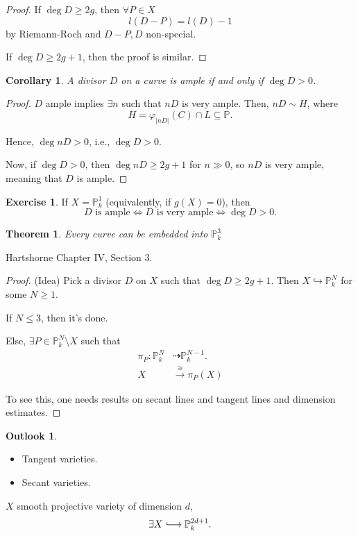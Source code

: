 \documentclass[12pt]{article}
\newtheorem*{theorem}{Theorem}
\newtheorem*{corollary}{Corollary}
\theoremstyle{definition}
\newtheorem*{exercise}{Exercise}
\newtheorem*{outlook}{Outlook}
\begin{document}
\begin{proof}
If $\deg D\geq2g$, then $\forall P\in X$
\[l(D-P)=l(D)-1\]
by Riemann-Roch and $D-P,D$ non-special.

If $\deg D\geq2g+1$, then the proof is similar.
\end{proof}

\begin{corollary}
A divisor $D$ on a curve is ample if and only if $\deg D>0$.
\end{corollary}

\begin{proof}
$D$ ample implies $\exists n$ such that $nD$ is very ample. Then, $nD\sim H$, where
\[H=\varphi_{|nD|}(C)\cap L\subseteq\mathbb{P}.\]

Hence, $\deg nD>0$, i.e., $\deg D>0$.

Now, if $\deg D>0$, then $\deg nD\geq2g+1$ for $n\gg0$, so $nD$ is very ample, meaning that $D$ is ample.
\end{proof}

\begin{exercise}
If $X=\mathbb{P}_k^1$ (equivalently, if $g(X)=0$), then
\[D\text{ is ample}\Longleftrightarrow D\text{ is very ample}\Longleftrightarrow\deg D>0.\]
\end{exercise}

\begin{theorem}
Every curve can be embedded into $\mathbb{P}_k^3$
\end{theorem}

Hartshorne \cite{hartshorne2013algebraic} Chapter IV, Section 3.

\begin{proof}
(Idea) Pick a divisor $D$ on $X$ such that $\deg D\geq2g+1$. Then $X\hookrightarrow\mathbb{P}_k^N$ for some $N\geq1$.

If $N\leq3$, then it's done.

Else, $\exists P\in\mathbb{P}_k^N\setminus X$ such that
\begin{align*}\tag{Projection away from $P$}
\pi_P:\mathbb{P}_k^N&\dashrightarrow\mathbb{P}_k^{N-1}.\\
X&\overset{\cong}{\longrightarrow}\pi_P(X)
\end{align*}

To see this, one needs results on secant lines and tangent lines and dimension estimates.
\end{proof}

\begin{outlook}
\begin{itemize}[label=$-$]
\item Tangent varieties.
\item Secant varieties.
\end{itemize}

$X$ smooth projective variety of dimension $d$,
\[\exists X\lhook\joinrel\longrightarrow\mathbb{P}_k^{2d+1}.\]
\end{outlook}
\end{document}
